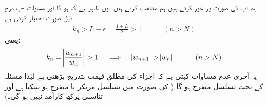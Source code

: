 ہم اب  کی صورت پر غور کرتے ہیں۔ہم  منتخب کرتے ہیں۔یوں ظاہر ہے کہ  ہو گا اور  مساوات -ب درج ذیل صورت اختیار کرتی ہے
\begin{align}
k_n>L-\epsilon=\frac{1+L}{2}>1\quad \quad \quad (n>N)
\end{align}
یعنی:
\begin{align}
k_n=\abs{\frac{w_{n+1}}{w_n}}>1 \quad \implies \quad \abs{w_{n+1}}>\abs{w_n} \quad \quad \quad (n>N)
\end{align}
یہ آخری عدم مساوات کہتی ہے کہ اجزاء کی مطلق قیمت بتدریج بڑھتی ہے لہٰذا مسئلہ  کے تحت تسلسل منفرج ہو گا۔( کی صورت میں تسلسل مرتکز یا منفرج ہو سکتا ہے اور  تناسبی پرکھ کارآمد نہیں ہو گی۔)

